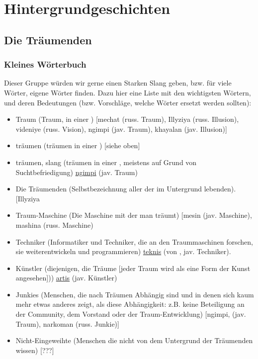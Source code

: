 \documentclass[12pt, a4paper, openany]{report}
\begin{document}
\section{Hintergrundgeschichten}

\subsection{Die Träumenden} 

\subsubsection{Kleines Wörterbuch}
Dieser Gruppe würden wir gerne einen Starken Slang geben, bzw. für viele Wörter, eigene Wörter finden. 
Dazu hier eine Liste mit den wichtigsten Wörtern, und deren Bedeutungen (bzw. Vorschläge, welche Wörter ersetzt werden sollten):
\begin{itemize}
  \setlength\itemsep{0em}
  \item Traum (Traum, in einer ) [mechat (russ. Traum), Illyziya (russ. Illusion), videniye (russ. Vision), ngimpi (jav. Traum), khayalan (jav. Illusion)]
  \item träumen (träumen in einer ) [siehe oben]
  \item träumen, slang (träumen in einer , meistens auf Grund von Suchtbefriedigung) \underline{ngimpi} (jav. Traum)
  \item Die Träumenden (Selbstbezeichnung aller der im Untergrund lebenden). [Illyziya
  \item Traum-Maschine (Die Maschine mit der man träumt) [mesin (jav. Maschine), mashina (russ. Maschine)
  \item Techniker (Informatiker und Techniker, die an den Traummaschinen forschen, sie weiterentwickeln und programmieren) \underline{teknis} (von , jav. Techniker).
  \item Künstler (diejenigen, die Träume [jeder Traum wird als eine Form der Kunst angesehen])) \underline{artis} (jav. Künstler)
  \item Junkies (Menschen, die nach Träumen Abhängig sind und in denen sich kaum mehr etwas anderes zeigt, als diese Abhängigkeit: z.B. keine Beteiligung an der Community, dem Vorstand oder der Traum-Entwicklung) [ngimpi, (jav. Traum), narkoman (russ. Junkie)]
  \item Nicht-Eingeweihte (Menschen die nicht von dem Untergrund der Träumenden wissen) [???]
\end{itemize}
\end{document}
